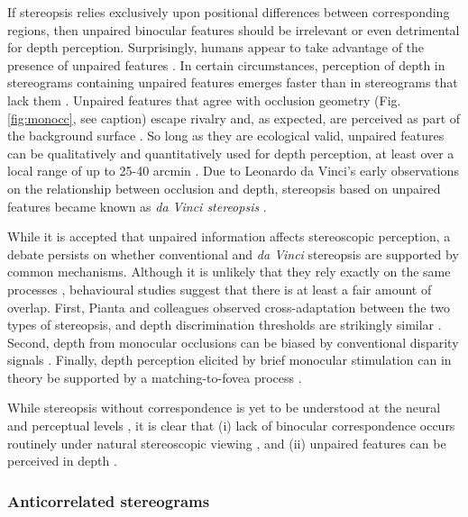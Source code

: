 If stereopsis relies exclusively upon positional differences between corresponding regions, then unpaired binocular features should be irrelevant or even detrimental for depth perception. Surprisingly, humans appear to take advantage of the presence of unpaired features \cite{Gillam:1988lo, Shimojo:1988fk, Nakayama:1990fc, Shimojo:1990uq}. In certain circumstances, perception of depth in stereograms containing unpaired features emerges faster than in stereograms that lack them \cite{Gillam:1988lo}. Unpaired features that agree with occlusion geometry (Fig. \ref{fig:monocc}, see caption) escape rivalry and, as expected, are perceived as part of the background surface \cite{Shimojo:1990uq}. So long as they are ecological valid, unpaired features can be qualitatively and quantitatively used for depth perception, at least over a local range of up to 25-40 arcmin \cite{Nakayama:1990fc}. Due to Leonardo da Vinci's early observations on the relationship between occlusion and depth, stereopsis based on unpaired features became known as \textit{da Vinci stereopsis} \cite{Nakayama:1990fc}. 

While it is accepted that unpaired information affects stereoscopic perception, a debate persists on whether conventional and \textit{da Vinci} stereopsis are supported by common mechanisms. Although it is unlikely that they rely exactly on the same processes \cite{Gillam:2003bh,Tsirlin:2012ys}, behavioural studies suggest that there is at least a fair amount of overlap. First, Pianta and colleagues observed cross-adaptation between the two types of stereopsis, and depth discrimination thresholds are strikingly similar \cite{Pianta:2003mz}. Second, depth from monocular occlusions can be biased by conventional disparity signals \cite{Tsirlin:2011bd}. Finally, depth perception elicited by brief monocular stimulation \cite{Kaye:1978os} can in theory be supported by a matching-to-fovea process \cite{Wilcox:2007zt}.

While stereopsis without correspondence is yet to be understood at the neural and perceptual levels \cite{Harris:2009qf}, it is clear that (i) lack of binocular correspondence occurs routinely under natural stereoscopic viewing \cite{Lawson:1967dq,Nakayama:1990fc,Anderson:1994fk,Anderson:1994qc}, and (ii) unpaired features can be perceived in depth \cite{Nakayama:1990fc, Shimojo:1990uq}. 

\subsubsection{Anticorrelated stereograms} \label{sssec: ards}

